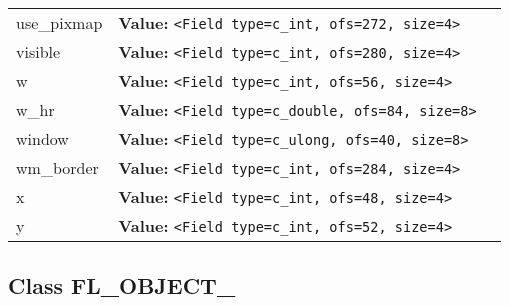 \begin{longtable}{|p{\varnamewidth}|p{\vardescrwidth}|l}
\raggedright u\-s\-e\-\_\-p\-i\-x\-m\-a\-p\- & \raggedright \textbf{Value:} 
{\tt {\textless}Field type=c\_int, ofs=272, size=4{\textgreater}}&\\
\cline{1-2}
\raggedright v\-i\-s\-i\-b\-l\-e\- & \raggedright \textbf{Value:} 
{\tt {\textless}Field type=c\_int, ofs=280, size=4{\textgreater}}&\\
\cline{1-2}
\raggedright w\- & \raggedright \textbf{Value:} 
{\tt {\textless}Field type=c\_int, ofs=56, size=4{\textgreater}}&\\
\cline{1-2}
\raggedright w\-\_\-h\-r\- & \raggedright \textbf{Value:} 
{\tt {\textless}Field type=c\_double, ofs=84, size=8{\textgreater}}&\\
\cline{1-2}
\raggedright w\-i\-n\-d\-o\-w\- & \raggedright \textbf{Value:} 
{\tt {\textless}Field type=c\_ulong, ofs=40, size=8{\textgreater}}&\\
\cline{1-2}
\raggedright w\-m\-\_\-b\-o\-r\-d\-e\-r\- & \raggedright \textbf{Value:} 
{\tt {\textless}Field type=c\_int, ofs=284, size=4{\textgreater}}&\\
\cline{1-2}
\raggedright x\- & \raggedright \textbf{Value:} 
{\tt {\textless}Field type=c\_int, ofs=48, size=4{\textgreater}}&\\
\cline{1-2}
\raggedright y\- & \raggedright \textbf{Value:} 
{\tt {\textless}Field type=c\_int, ofs=52, size=4{\textgreater}}&\\
\cline{1-2}
\end{longtable}



\subsection{Class FL\_OBJECT\_}


